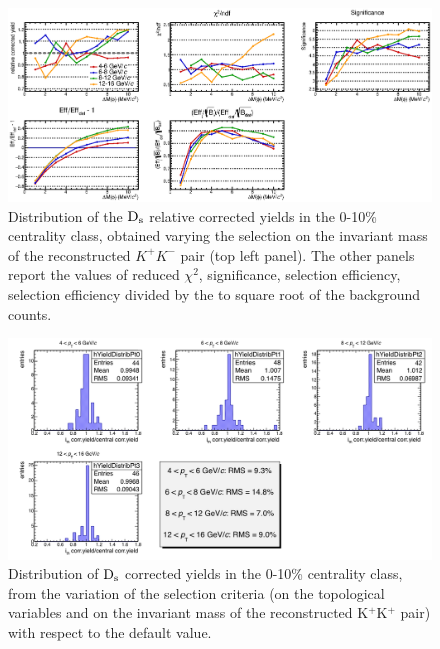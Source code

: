\begin{figure}[!h]
 \begin{center}
   \includegraphics[angle=0, width=15cm]{./FigCap5/cutbycut_invm_010.eps}
 \end{center}
 \caption{Distribution of the ${\rm D_s}$ relative corrected yields in the 0-10\% centrality class, obtained varying the selection on the invariant mass of the reconstructed $K^+K^-$ pair (top left panel). The other panels report the values of reduced $\chi^2$, significance, selection efficiency, selection efficiency divided by the to square root of the background counts.}
 \label{fig:DeltaMDsCutVar_010} 
\end{figure}
\begin{figure}[!h]
 \begin{center}
   \includegraphics[angle=0, width=15cm]{./FigCap5/FinalSyst_010.png}
 \end{center}
 \caption{Distribution of ${\rm D_s}$ corrected yields in the 0-10\% centrality class, from the variation of the selection criteria (on the topological variables and on the invariant mass of the reconstructed K$^+$K$^+$ pair) with respect to the default value.}
 \label{fig:DsCutVar_010} 
\end{figure}

